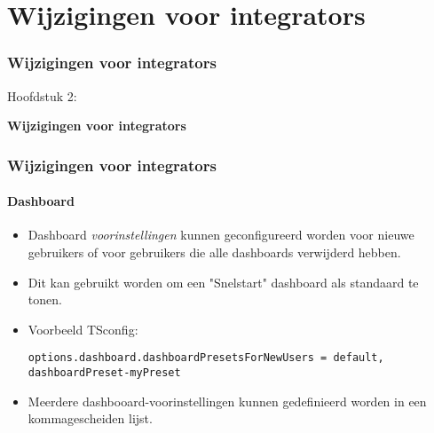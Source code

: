%

\section{Wijzigingen voor integrators}
\begin{frame}[fragile]
	\frametitle{Wijzigingen voor integrators}

	\begin{center}\huge{Hoofdstuk 2:}\end{center}
	\begin{center}\huge{\color{typo3darkgrey}\textbf{Wijzigingen voor integrators}}\end{center}

\end{frame}


\begin{frame}[fragile]
	\frametitle{Wijzigingen voor integrators}
	\framesubtitle{Dashboard}

	\lstset{basicstyle=\tiny\ttfamily}

	\begin{itemize}
		\item Dashboard \textit{voorinstellingen} kunnen geconfigureerd worden voor nieuwe gebruikers of voor gebruikers
			die alle dashboards verwijderd hebben.
		\item Dit kan gebruikt worden om een "Snelstart" dashboard als standaard te tonen.
		\item Voorbeeld TSconfig:

\vspace{-0.4cm}
\begin{lstlisting}
options.dashboard.dashboardPresetsForNewUsers = default, dashboardPreset-myPreset
\end{lstlisting}

		\item Meerdere dashbooard-voorinstellingen kunnen gedefinieerd worden in een kommagescheiden lijst.

	\end{itemize}

\end{frame}

